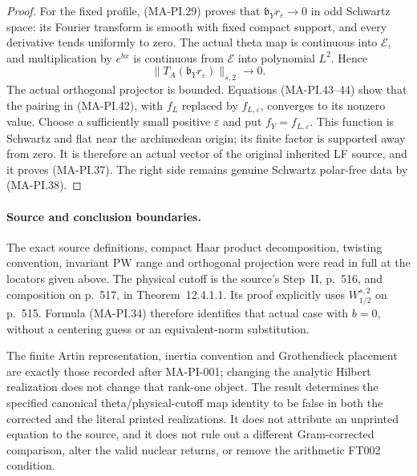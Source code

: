 \begin{proof}
For the fixed profile, (MA-PI.29) proves that
$\mathfrak b_Y r_\varepsilon\to0$ in odd Schwartz space:
its Fourier transform is smooth with fixed compact support,
and every derivative tends uniformly to zero.  The actual
theta map is continuous into $\mathcal E$, and multiplication
by $e^{bx}$ is continuous from $\mathcal E$ into polynomial
$L^2$.  Hence
\[
       \|T_A(\mathfrak b_Y r_\varepsilon)\|_{s,2}\to0.
 \tag{MA-PI.44}
\]
The actual orthogonal projector is bounded.  Equations
(MA-PI.43--44) show that the pairing in (MA-PI.42), with
$f_L$ replaced by $f_{L,\varepsilon}$, converges to its
nonzero value.  Choose a sufficiently small positive
$\varepsilon$ and put $f_Y=f_{L,\varepsilon}$.
This function is Schwartz and flat near the archimedean
origin; its finite factor is supported away from zero.
It is therefore an actual vector of the original inherited
LF source, and it proves (MA-PI.37).  The right side
remains genuine Schwartz polar-free data by (MA-PI.38).
\end{proof}

\paragraph{Source and conclusion boundaries.}
The exact source definitions, compact Haar product decomposition,
twisting convention, invariant PW range and orthogonal projection
were read in full at the locators given above.  The physical
cutoff is the source's Step~II, p.~516, and composition on
p.~517, in Theorem~12.4.1.1.  Its proof explicitly uses
$W_{1/2}^{s,2}$ on p.~515.  Formula (MA-PI.34) therefore
identifies that actual case with $b=0$, without a centering
guess or an equivalent-norm substitution.

The finite Artin representation, inertia convention and
Grothendieck placement are exactly those recorded after
MA-PI-001; changing the analytic Hilbert realization does
not change that rank-one object.  The result determines
the specified canonical theta/physical-cutoff map identity
to be false in both the corrected and the literal printed
realizations.  It does not attribute an unprinted equation
to the source, and it does not rule out a different
Gram-corrected comparison, alter the valid nuclear returns,
or remove the arithmetic FT002 condition.

